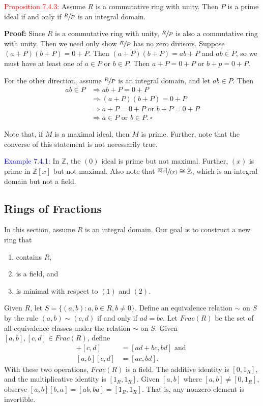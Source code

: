 \documentclass{article}
\begin{document}
\textcolor{red}{Proposition 7.4.3:} Assume $R$ is a commutative ring with unity. Then $P$ is a prime ideal if and only if $\sfrac{R}{P}$ 
is an integral domain.

\textbf{Proof:} Since $R$ is a commutative ring with unity, $\sfrac{R}{P}$ is also a commutative ring with unity. Then we need only show 
$\sfrac{R}{P}$ has no zero divisors. Suppose $(a+P)(b+P) = 0+P$. Then $(a+P)(b+P)= ab+P$ and $ab \in P$, so we must have at least one of 
$a \in P$ or $b \in P$. Then $a+P = 0+P$ or $b+p = 0+P$.

For the other direction, assume $\sfrac{R}{P}$ is an integral domain, and let $ab \in P$. Then
\begin{align*}
    ab \in P &\Longrightarrow ab+P=0+P \\
    &\Longrightarrow (a+P)(b+P) = 0+P \\
    &\Longrightarrow a+P = 0+P \text{ or } b+P = 0+P \\
    &\Longrightarrow a \in P \text{ or } b \in P. \ \square 
\end{align*}

Note that, if $M$ is a maximal ideal, then $M$ is prime. Further, note that the converse of this statement is not necessarily true.

\textcolor{blue}{Example 7.4.1:} In $\mathbb{Z}$, the $(0)$ ideal is prime but not maximal. Further, $(x)$ is prime in $\mathbb{Z}[x]$ but 
not maximal. Also note that $\sfrac{\mathbb{Z}[x]}{(x)} \cong \mathbb{Z}$, which is an integral domain but not a field. 

\subsection{Rings of Fractions}

In this section, assume $R$ is an integral domain. Our goal is to construct a new ring that 
\begin{enumerate}
    \item contains $R$,
    \item is a field, and 
    \item is minimal with respect to $(1)$ and $(2)$.
\end{enumerate}

Given $R$, let $S = \{(a,b): a,b \in R, b \neq 0\}$. Define an equivalence relation $\sim$ on $S$ by the rule $(a,b) \sim (c,d)$ if and 
only if $ad=bc$. Let $Frac(R)$ be the set of all equivalence classes under the relation $\sim$ on $S$. Given $[a,b],[c,d] \in Frac(R)$, 
define
\begin{align*}
    [a,b]+[c,d] &= [ad+bc,bd] \text{ and } \\
    [a,b][c,d] &= [ac,bd].
\end{align*}
With these two operations, $Frac(R)$ is a field. The additive identity is $[0,1_R]$, and the multiplicative identity is $[1_R,1_R]$. Given 
$[a,b]$ where $[a,b] \neq [0,1_R]$, observe $[a,b][b,a] = [ab,ba]=[1_R,1_R]$. That is, any nonzero element is invertible. 
\end{document}
